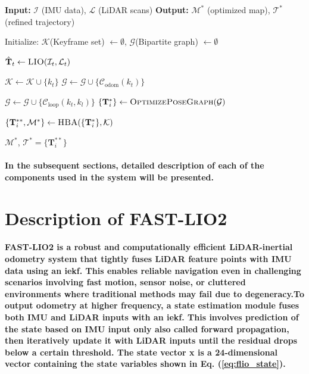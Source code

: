 \begin{algorithm}
	\caption{LiDAR-Inertial Odometry with Global Optimization}
	\label{alg:lio_opt}
	\begin{algorithmic}[1]
		\State \textbf{Input:} $\mathcal{I}$ (IMU data), $\mathcal{L}$ (LiDAR scans)
		\State \textbf{Output:} $\mathcal{M}^*$ (optimized map), $\mathcal{T}^*$ (refined trajectory)
		
		\State Initialize: $\mathcal{K}$(Keyframe set) $\gets \emptyset$, $\mathcal{G}$(Bipartite graph) $\gets \emptyset$
		
		\State $\hat{\mathbf{T}}_t \gets \textsc{LIO}(\mathcal{I}_t, \mathcal{L}_t)$ 
		
		\State $\mathcal{K} \gets \mathcal{K} \cup \{k_t\}$ 
		\State $\mathcal{G} \gets \mathcal{G} \cup \{\mathcal{C}_{\text{odom}}(k_t)\}$ 
		
		\State $\mathcal{G} \gets \mathcal{G} \cup \{\mathcal{C}_{\text{loop}}(k_t, k_l)\}$ 
		\State $\{\mathbf{T}_i^*\} \gets \textsc{OptimizePoseGraph}(\mathcal{G})$
		\EndIf
		\EndIf
		\EndWhile
		
		\State $\{\mathbf{T}_i^{**}, \mathcal{M}^*\} \gets \textsc{HBA}(\{\mathbf{T}_i^*\}, \mathcal{K})$
		
		\State \Return $\mathcal{M}^*$, $\mathcal{T}^* = \{\mathbf{T}_i^{**}\}$
	\end{algorithmic}
\end{algorithm}
\paragraph{\textnormal{In the subsequent sections, detailed description of each of the components used in the system will be presented.}}

\section{Description of FAST-LIO2}
\paragraph{\textnormal{FAST-LIO2 is a robust and computationally efficient LiDAR-inertial odometry system that tightly fuses LiDAR feature points with IMU data using an \gls{iekf}. This enables reliable navigation even in challenging scenarios involving fast motion, sensor noise, or cluttered environments where traditional methods may fail due to degeneracy.To output odometry at higher frequency, a state estimation module fuses both IMU and LiDAR inputs with an \gls{iekf}. This involves prediction of the state based on IMU input only also called forward propagation, then iteratively update it with LiDAR inputs until the residual drops below a certain threshold. The state vector \textbf{x} is a 24-dimensional vector containing the state variables shown in Eq. (\ref{eq:flio_state}).}}

